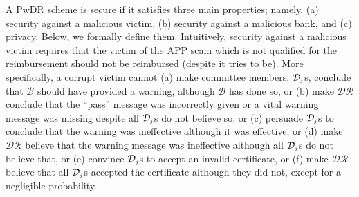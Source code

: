 A PwDR scheme is  secure if it satisfies three main properties; namely, (a) security against a malicious victim, (b) security against a malicious bank, and (c) privacy. Below, we formally define  them. Intuitively, security against a malicious victim requires that the victim of the APP scam which is not qualified for the reimbursement should not be reimbursed  (despite  it tries to be). More specifically, a corrupt victim cannot (a) make committee members, $\mathcal{D}_{\scriptscriptstyle j}$s,  conclude that $\mathcal{B}$ should have provided a warning, although $\mathcal{B}$ has done so, or (b) make $\mathcal{DR}$ conclude that the  ``pass'' message was incorrectly given or a vital warning message was missing despite all  $\mathcal{D}_{\scriptscriptstyle j}$s do not believe so, or (c) persuade $\mathcal{D}_{\scriptscriptstyle j}$s to  conclude that the warning was ineffective although it was effective, or (d)  make $\mathcal{DR}$ believe that the warning message was ineffective although all $\mathcal{D}_{\scriptscriptstyle j}$s do not believe that, or (e)  convince  $\mathcal{D}_{\scriptscriptstyle j}$s to accept an invalid certificate, or (f) make $\mathcal{DR}$ believe that all $\mathcal{D}_{\scriptscriptstyle j}$s accepted the certificate  although they did not, except for a negligible probability. 







